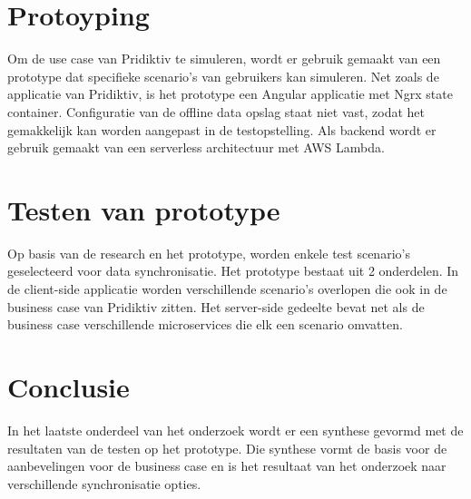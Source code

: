 \section{Protoyping}
Om de use case van Pridiktiv te simuleren, wordt er gebruik gemaakt van een prototype dat specifieke scenario's van gebruikers kan simuleren. Net zoals de applicatie van Pridiktiv, is het prototype een Angular applicatie met Ngrx state container. Configuratie van de offline data opslag staat niet vast, zodat het gemakkelijk kan worden aangepast in de testopstelling. Als backend wordt er gebruik gemaakt van een serverless architectuur met AWS Lambda.
\section{Testen van prototype}
Op basis van de research en het prototype, worden enkele test scenario's geselecteerd voor data synchronisatie. Het prototype bestaat uit 2 onderdelen. In de client-side applicatie worden verschillende scenario's overlopen die ook in de business case van Pridiktiv zitten. Het server-side gedeelte bevat net als de business case verschillende microservices die elk een scenario omvatten.
\section{Conclusie}
In het laatste onderdeel van het onderzoek wordt er een synthese gevormd met de resultaten van de testen op het prototype. Die synthese vormt de basis voor de aanbevelingen voor de business case en is het resultaat van het onderzoek naar verschillende synchronisatie opties.

